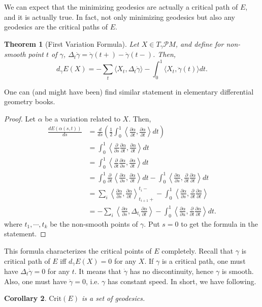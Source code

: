 \documentclass{article}
\newtheorem{theorem}{Theorem}[section]
\newtheorem{corollary}[theorem]{Corollary}
\newcommand{\il}{\langle}
\newcommand{\ir}{\rangle}
\newcommand{\pp}{\partial}
\newcommand{\PM}{\mathcal{P}M}
\newcommand{\g}{\gamma}
\newcommand{\Crit}{\mathrm{Crit}}
\begin{document}
We can expect that the minimizing geodesics are actually a critical path of $E$, and it is actually true.
In fact, not only minimizing geodesics but also any geodesics are the critical paths of $E$.
	\begin{theorem}[First Variation Formula]\rm
	Let $X\in T_\g\PM$, and define for non-smooth point $t$ of $\g$, $\Delta_t\dot{\g}=\dot{\g}(t+)-\dot{\g}(t-)$.
	Then,
		$$d_\g E(X)=-\sum_t\il X_t,\Delta_t\dot{\g}\ir-\int_0^1\il X_t,\ddot{\g}(t)\ir dt.$$
	\end{theorem}
		One can (and might have been) find similar statement in elementary differential geometry books.
		\begin{proof}
		Let $\alpha$ be a variation related to $X$. Then,
			$$\begin{aligned}
			\frac{dE(\alpha(s,t))}{ds}
				&=\frac{d}{ds}\left(\frac{1}{2}\int_0^1\left\il\frac{\pp\alpha}{\pp t},\frac{\pp\alpha}{\pp t}\right\ir dt\right)\\
				&=\int_0^1\left\il \frac{\pp}{\pp s}\frac{\pp\alpha}{\pp t},\frac{\pp\alpha}{\pp t}\right\ir dt\\
				&=\int_0^1\left\il \frac{\pp}{\pp t}\frac{\pp\alpha}{\pp s},\frac{\pp\alpha}{\pp t}\right\ir dt\\
				&=\int_0^1\frac{\pp}{\pp t}\left\il \frac{\pp\alpha}{\pp s},\frac{\pp\alpha}{\pp t}\right\ir dt
				- \int_0^1\left\il \frac{\pp\alpha}{\pp s},\frac{\pp}{\pp t}\frac{\pp\alpha}{\pp t}\right\ir dt\\
				&=\sum_{i}\left\il\frac{\pp \alpha}{\pp s},\frac{\pp \alpha}{\pp t}\right\ir^{t_i-}_{t_{i+1}+}
			-\int^{1}_{0}\left\il \frac{\pp\alpha}{\pp s},\frac{\pp}{\pp t}\frac{\pp\alpha}{\pp t}\right\ir\\
				&=-\sum_i\left\il\frac{\pp\alpha}{\pp s},\Delta_{t_i}\frac{\pp\alpha}{\pp t}\right\ir-\int_0^1\left\il\frac{\pp\alpha}{\pp u},\frac{\pp}{\pp t}\frac{\pp\alpha}{\pp t}\right\ir dt.
				\end{aligned}$$
		where $t_1,\cdots,t_k$ be the non-smooth points of $\g$.
		Put $s=0$ to get the formula in the statement.
		\end{proof}
This formula characterizes the critical points of $E$ completely. Recall that $\g$ is critical path of $E$ iff $d_\g E(X)=0$ for any $X$.
If $\g$ is a critical path, one must have $\Delta_t\dot{\g}=0$ for any $t$.
It means that $\dot{\g}$ has no discontinuity, hence $\g$ is smooth.
Also, one must have $\ddot{\g}=0$, i.e. $\g$ has constant speed.
In short, we have following.
	\begin{corollary}\rm
	$\Crit(E)$ is a set of geodesics.
	\end{corollary}
\end{document}
